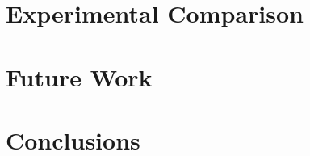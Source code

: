 \documentclass{article}
\begin{document}
\section{Experimental Comparison}


\section{Future Work}


\section{Conclusions}



\end{document}
